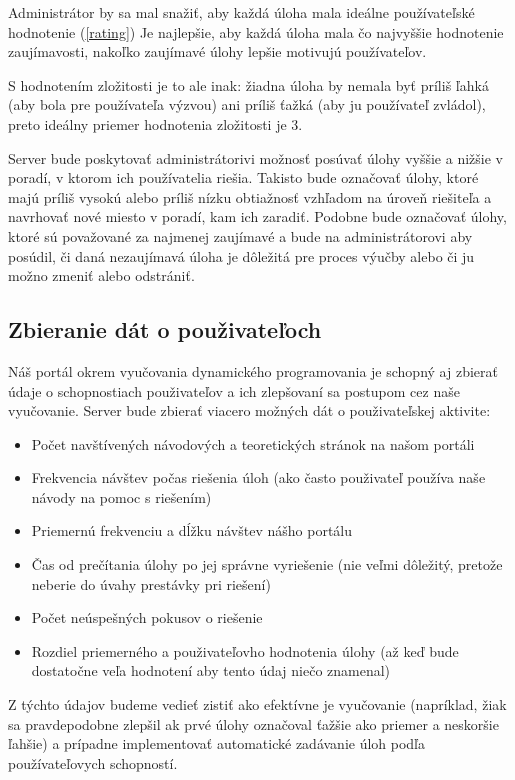 Administrátor by sa mal snažiť, aby každá úloha mala ideálne používateľské hodnotenie (\ref{rating})
Je najlepšie, aby každá úloha mala čo najvyššie hodnotenie zaujímavosti, nakoľko zaujímavé úlohy lepšie motivujú používateľov.

S hodnotením zložitosti je to ale inak: žiadna úloha by nemala byť príliš ľahká (aby bola pre používateľa výzvou) ani
príliš ťažká (aby ju používateľ zvládol), preto ideálny priemer hodnotenia zložitosti je 3.

Server bude poskytovať administrátorivi možnosť posúvať úlohy vyššie a nižšie v poradí, v ktorom ich používatelia riešia. Takisto bude označovať úlohy, ktoré majú príliš vysokú alebo príliš nízku obtiažnosť vzhľadom na úroveň riešiteľa a navrhovať nové miesto v poradí, kam ich zaradiť. Podobne bude označovať úlohy, ktoré sú považované za najmenej zaujímavé a bude na administrátorovi aby posúdil, či daná nezaujímavá úloha je dôležitá pre proces výučby alebo či ju možno zmeniť alebo odstrániť.
\subsection{Zbieranie dát o použivateľoch}
\label{zbieraniedata}
Náš portál okrem vyučovania dynamického programovania je schopný aj zbierať údaje o schopnostiach použivateľov a ich zlepšovaní sa postupom cez naše vyučovanie. Server bude zbierať viacero možných dát o použivateľskej aktivite:
\begin{itemize}
\item Počet navštívených návodových a teoretických stránok na našom portáli
\item Frekvencia návštev počas riešenia úloh (ako často použivateľ používa naše návody na pomoc s riešením)
\item Priemernú frekvenciu a dĺžku návštev nášho portálu
\item Čas od prečítania úlohy po jej správne vyriešenie (nie veľmi dôležitý, pretože neberie do úvahy prestávky pri riešení)
\item Počet neúspešných pokusov o riešenie
\item Rozdiel priemerného a použivateľovho hodnotenia úlohy (až keď bude dostatočne veľa hodnotení aby tento údaj niečo znamenal)
\end{itemize}

Z týchto údajov budeme vedieť zistiť ako efektívne je vyučovanie (napríklad, žiak sa pravdepodobne zlepšil ak prvé úlohy označoval ťažšie ako priemer a neskoršie ľahšie) a prípadne implementovať automatické zadávanie úloh podľa používateľovych schopností.

